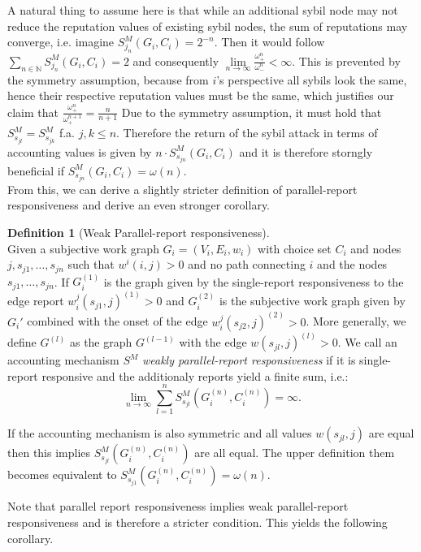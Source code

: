 \documentclass[11pt,a4paper]{article}
\theoremstyle{definition}
\newtheorem{definition}{Definition}[section]
\theoremstyle{theorem}
\theoremstyle{proposition}
\theoremstyle{corollary}
\theoremstyle{lemma}
\theoremstyle{example}
\theoremstyle{remark}
\begin{document}
\noindent{}A natural thing to assume here is that while an additional sybil node may not reduce the reputation values of existing sybil nodes, the sum of reputations may converge, i.e. imagine $S^M_{j_n}(G_i,C_i)=2^{-n}$. Then it would follow $\sum\limits_{n\in\mathbb{N}}S^M_{j_n}(G_i,C_i)=2$ and consequently $\lim\limits_{n\rightarrow\infty}\frac{\omega^n_{+}}{\omega^n_{-}}<\infty$. This is prevented by the symmetry assumption, because from $i$'s perspective all sybils look the same, hence their respective reputation values must be the same, which justifies our claim that $\frac{\omega_{+}^n}{\omega_{+}^{n+1}}=\frac{n}{n+1}$ Due to the symmetry assumption, it must hold that $S^M_{s_{jl}}=S^M_{s_{jk}}$ f.a. $j,k\leq{}n$. Therefore the return of the sybil attack in terms of accounting values is given by $n\cdot{}S^M_{s_{jn}}(G_i,C_i)$ and it is therefore storngly beneficial if $S^M_{s_{jn}}(G_i,C_i)=\omega(n)$. \vspace{1em}\\ 

\noindent{}From this, we can derive a slightly stricter definition of parallel-report responsiveness and derive an even stronger corollary. 

\begin{definition}[Weak Parallel-report responsiveness]\ \\
Given a subjective work graph $G_i=(V_i,E_i,w_i)$ with choice set $C_i$ and nodes $j,s_{j1},\ldots{},s_{jn}$ such that $w^i(i,j)>0$ and no path connecting $i$ and the nodes $s_{j1},\ldots{},s_{jn}$. If $G_i^{(1)}$ is the graph given by the single-report responsiveness to the edge report $w^j_i(s_{j1},j)^{(1)}>0$ and $G_i^{(2)}$ is the subjective work graph given by $G_i'$ combined with the onset of the edge $w^j_i(s_{j2},j)^{(2)}>0$. More generally, we define $G^{(l)}$ as the graph $G^{(l-1)}$ with the edge $w(s_{jl},j)^{(l)}>0.$ We call an accounting mechanism $S^M$ {\it weakly parallel-report responsiveness} if it is single-report responsive and the additionaly reports yield a finite sum, i.e.:
\[
\lim\limits_{n\rightarrow\infty}\sum\limits_{l=1}^{n}S^M_{s_{jl}}(G_i^{(n)},C_i^{(n)})=\infty .
\] 

\noindent{}If the accounting mechanism is also symmetric and all values $w(s_{jl},j)$ are equal then this implies $S^M_{s_{jl}}(G_i^{(n)},C_i^{(n)})$ are all equal. The upper definition them becomes equivalent to $S^M_{s_{j1}}(G_i^{(n)},C_i^{(n)}) = \omega(n)$.
\end{definition}

\noindent{}Note that parallel report responsiveness implies weak parallel-report responsiveness and is therefore a stricter condition. This yields the following corollary. 
\end{document}

